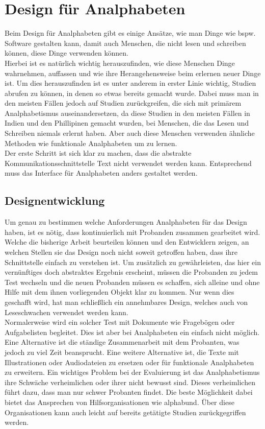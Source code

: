 \section{Design für Analphabeten}

Beim Design für Analphabeten gibt es einige Ansätze, wie man Dinge wie bspw. Software gestalten kann, damit auch Menschen, die nicht lesen und schreiben können, diese Dinge verwenden können.\\
Hierbei ist es natürlich wichtig herauszufinden, wie diese Menschen Dinge wahrnehmen, auffassen und wie ihre Herangehensweise beim erlernen neuer Dinge ist. Um dies herauszufinden ist es unter anderem in erster Linie wichtig, Studien abrufen zu können, in denen so etwas bereits gemacht wurde. Dabei muss man in den meisten Fällen jedoch auf Studien zurückgreifen, die sich mit primärem Analphabetismus auseinandersetzen, da diese Studien in den meisten Fällen in Indien und den Phillipinen gemacht wurden, bei Menschen, die das Lesen und Schreiben niemals erlernt haben. Aber auch diese Menschen verwenden ähnliche Methoden wie funktionale Analphabeten um zu lernen.\\
Der erste Schritt ist sich klar zu machen, dass die abstrakte Kommunikationsschnittstelle Text nicht verwendet werden kann. Entsprechend muss das Interface für Analphabeten anders gestaltet werden.

\subsection{Designentwicklung}
Um genau zu bestimmen welche Anforderungen Analphabeten für das Design haben, ist es nötig, dass kontinuierlich mit Probanden zusammen gearbeitet wird. Welche die bisherige Arbeit beurteilen können und den Entwicklern zeigen, an welchen Stellen sie das Design noch nicht soweit getroffen haben, dass ihre Schnittstelle einfach zu verstehen ist. Um zusätzlich zu gewährleisten, das hier ein vernünftiges doch abstraktes Ergebnis erscheint, müssen die Probanden zu jedem Test wechseln und die neuen Probanden müssen es schaffen, sich alleine und ohne Hilfe mit dem ihnen vorliegenden Objekt klar zu kommen. Nur wenn dies geschafft wird, hat man schließlich ein annehmbares Design, welches auch von Leseschwachen verwendet werden kann.\\

Normalerweise wird ein solcher Test mit Dokumente wie Fragebögen oder Aufgabelisten begleitet. 
Dies ist aber bei Analphabeten ein einfach nicht möglich.
Eine Alternative ist die ständige Zusammenarbeit mit dem Probanten, was jedoch zu viel Zeit beansprucht. Eine weitere Alternative ist, die Texte mit Illustrationen oder Audiodateien zu ersetzen oder für funktionale Analphabeten zu erweitern. Ein wichtiges Problem bei der Evaluierung ist das Analphabetismus ihre Schwäche verheimlichen oder ihrer nicht bewusst sind. Dieses verheimlichen führt dazu, dass man nur schwer Probanten findet. Die beste Möglichkeit dabei bietet das Ansprechen von Hilfsorganisationen wie \glqq alphabund\grqq. Über diese Organisationen kann auch leicht auf bereits getätigte Studien zurückgegriffen werden.

